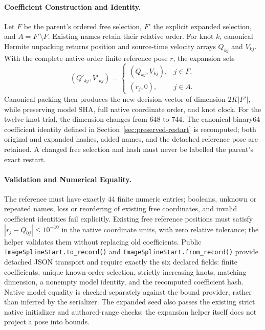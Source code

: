 \documentclass[11pt,letterpaper]{article}
\newcommand{\code}[1]{\nolinkurl{#1}}
\begin{document}
\paragraph{Coefficient Construction and Identity.}
Let $F$ be the parent's ordered free selection, $F'$ the explicit expanded
selection, and $A=F'\setminus F$. Existing names retain their relative order.
For knot $k$, canonical Hermite unpacking returns position and source-time
velocity arrays $Q_{kj}$ and $V_{kj}$. With the complete native-order finite
reference pose $r$, the expansion sets
\begin{equation}
 (Q'_{kj},V'_{kj})=
 \begin{cases}
 (Q_{kj},V_{kj}),&j\in F,\\
 (r_j,0),&j\in A.
 \end{cases}
\end{equation}
Canonical packing then produces the new decision vector of dimension
$2K|F'|$, while preserving model SHA, full native coordinate order, and knot
clock. For the twelve-knot trial, the dimension changes from 648 to 744.
The canonical binary64 coefficient identity defined in
Section~\ref{sec:preserved-restart} is recomputed; both original and expanded
hashes, added names, and the detached reference pose are retained. A changed
free selection and hash must never be labelled the parent's exact restart.

\paragraph{Validation and Numerical Equality.}
The reference must have exactly 44 finite numeric entries; booleans, unknown
or repeated names, loss or reordering of existing free coordinates, and invalid
coefficient identities fail explicitly. Existing free reference positions must
satisfy $|r_j-Q_{0j}|\leq10^{-10}$ in the native coordinate units, with zero
relative tolerance; the helper validates them without replacing old
coefficients. Public \code{ImageSplineStart.to_record()} and
\code{ImageSplineStart.from_record()} provide detached JSON transport and
require exactly the six declared fields: finite coefficients, unique known-order
selection, strictly increasing knots, matching dimension, a nonempty model
identity, and the recomputed coefficient hash. Native model equality is checked
separately against the bound provider, rather than inferred by the serializer.
The expanded seed also passes the existing strict native
initializer and authored-range checks; the expansion helper itself does not
project a pose into bounds.
\end{document}
